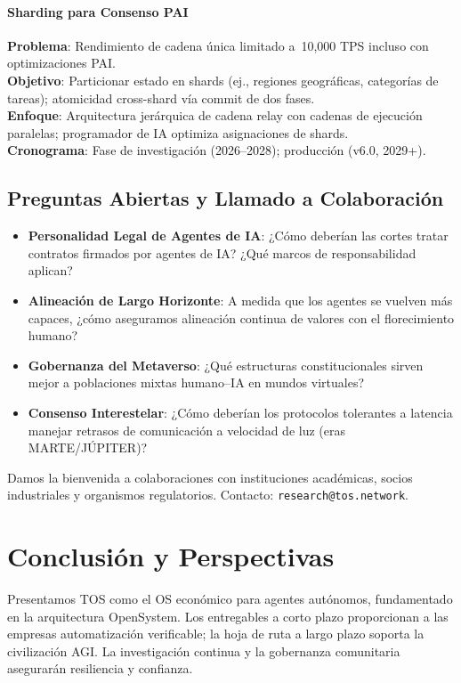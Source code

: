 \documentclass[11pt]{article}
\begin{document}
\paragraph{Sharding para Consenso PAI}
\textbf{Problema}: Rendimiento de cadena única limitado a~10,000 TPS incluso con optimizaciones PAI.\\
\textbf{Objetivo}: Particionar estado en shards (ej., regiones geográficas, categorías de tareas); atomicidad cross-shard vía commit de dos fases.\\
\textbf{Enfoque}: Arquitectura jerárquica de cadena relay con cadenas de ejecución paralelas; programador de IA optimiza asignaciones de shards.\\
\textbf{Cronograma}: Fase de investigación (2026--2028); producción (v6.0, 2029+).

\subsection{Preguntas Abiertas y Llamado a Colaboración}

\begin{itemize}[noitemsep]
  \item \textbf{Personalidad Legal de Agentes de IA}: ¿Cómo deberían las cortes tratar contratos firmados por agentes de IA? ¿Qué marcos de responsabilidad aplican?
  \item \textbf{Alineación de Largo Horizonte}: A medida que los agentes se vuelven más capaces, ¿cómo aseguramos alineación continua de valores con el florecimiento humano?
  \item \textbf{Gobernanza del Metaverso}: ¿Qué estructuras constitucionales sirven mejor a poblaciones mixtas humano--IA en mundos virtuales?
  \item \textbf{Consenso Interestelar}: ¿Cómo deberían los protocolos tolerantes a latencia manejar retrasos de comunicación a velocidad de luz (eras MARTE/JÚPITER)?
\end{itemize}

Damos la bienvenida a colaboraciones con instituciones académicas, socios industriales y organismos regulatorios. Contacto: \texttt{research@tos.network}.

\section{Conclusión y Perspectivas}
Presentamos TOS como el OS económico para agentes autónomos, fundamentado en la arquitectura OpenSystem. Los entregables a corto plazo proporcionan a las empresas automatización verificable; la hoja de ruta a largo plazo soporta la civilización AGI. La investigación continua y la gobernanza comunitaria asegurarán resiliencia y confianza.
\end{document}
